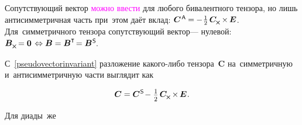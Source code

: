 \begin{otherlanguage}{russian}
\vspace{-0.6em}
Сопутствующий вектор \textcolor{magenta}{можно ввести} для любого бивалентного тензора, но лишь антисимметричная часть при~этом даёт вклад: ${\bm{C}^{\hspace{.2ex}\mathsf{A}} \hspace{-0.1ex} = \hspace{-0.1ex} - \hspace{.1ex}\onehalf\hspace{.32ex} \bm{C}_{\hspace{-0.1ex}\Xcompanion} \hspace{-0.16ex} \times \hspace{-0.16ex} \UnitDyad}$. Для~симметричного тензора сопутствующий вектор\:--- нулевой: ${\bm{B}_{\Xcompanion} \hspace{-0.25ex} = \bm{0} \hspace{.25ex} \Leftrightarrow \bm{B} = \bm{B}^{\T} \hspace{-0.32ex} = \bm{B}^{\mathsf{\hspace{.1ex}S}}\hspace{-0.32ex}}$.

С~\eqref{pseudovectorinvariant} разложение какого\hbox{-}либо тензора~$\bm{C}$ на~симметричную и~антисимметричную части выглядит как

\nopagebreak\vspace{-0.1em}\begin{equation}\label{symmetricantisymmetricdecompositionofsometensor}
\bm{C} = \bm{C}^{\mathsf{\hspace{.1ex}S}} \hspace{-0.32ex} - \hspace{.1ex} \smalldisplaystyleonehalf \hspace{.32ex} \bm{C}_{\hspace{-0.1ex}\Xcompanion} \hspace{-0.16ex} \times \hspace{-0.16ex} \UnitDyad
\hspace{.1ex} .
\end{equation}

\vspace{-0.8em}\noindent Для диады~же


\end{otherlanguage}
